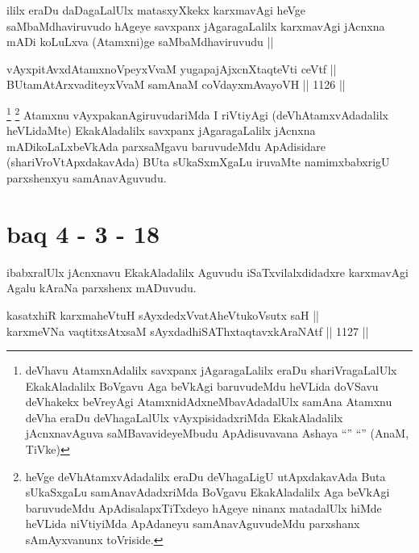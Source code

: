 \begin{artha}
ililx eraDu daDagaLalUlx matasxyXkekx karxmavAgi heVge saMbaMdhaviruvudo hAgeye savxpanx jAgaragaLalilx karxmavAgi jAcnxna mADi koLuLxva (Atamxni)ge saMbaMdhaviruvudu ||
\end{artha}


\begin{shl}
vAyxpitAvxdAtamxnoV\s peyxVvaM yugapajAjxcnXtaqteVti ceVtf || \\
BUtamAtArxvaditeyxVvaM samAnaM coVdayxmAvayoVH ||  1126 || 
\end{shl}

\begin{artha}
\footnote{deVhavu AtamxnAdalilx savxpanx jAgaragaLalilx eraDu shariVragaLalUlx EkakAladalilx BoVgavu Aga beVkAgi baruvudeMdu heVLida doVSavu deVhakekx beVreyAgi AtamxnidAdxneMbavAdadalUlx samAna Atamxnu deVha eraDu deVhagaLalUlx vAyxpisidadxriMda EkakAladalilx jAcnxnavAguva saMBavavideyeMbudu ApAdisuvavana Ashaya ``\stext'' ``\stext'' (AnaM, TiVke)}
\footnote{heVge deVhAtamxvAdadalilx eraDu deVhagaLigU utApxdakavAda Buta sUkaSxgaLu samAnavAdadxriMda BoVgavu EkakAladalilx Aga beVkAgi baruvudeMdu ApAdisalapxTiTxdeyo hAgeye ninanx matadalUlx hiMde heVLida niVtiyiMda ApAdaneyu samAnavAguvudeMdu parxshanx sAmAyxvanunx toVriside.}
Atamxnu vAyxpakanAgiruvudariMda I riVtiyAgi (deVhAtamxvAdadalilx heVLidaMte) EkakAladalilx savxpanx jAgaragaLalilx jAcnxna mADikoLaLxbeVkAda parxsaMgavu baruvudeMdu ApAdisidare (shariVroVtApxdakavAda) BUta sUkaSxmXgaLu iruvaMte namimxbabxrigU parxshenxyu samAnavAguvudu.
\end{artha}

\section*{baq 4 - 3 - 18}


\begin{artha}
ibabxralUlx jAcnxnavu EkakAladalilx Aguvudu iSaTxvilalxdidadxre karxmavAgi Agalu kAraNa parxshenx mADuvudu.
\end{artha}

\begin{shl}
kasatxhiR karxmaheVtuH sAyxdedxVvatAheVtukoV\s sutx saH || \\
karxmeVNa vaqtitxsAtxsaM sAyxdadhiSAThxtaqtavxkAraNAtf ||  1127 ||  
\end{shl}

